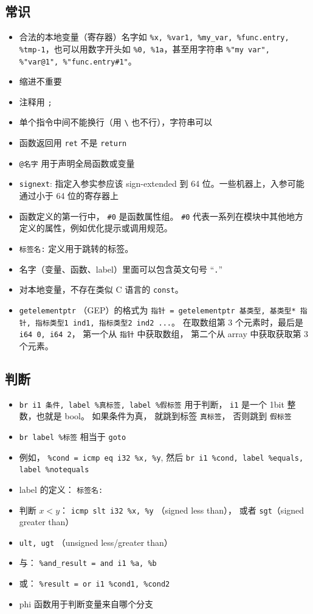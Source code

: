 \subsection{常识}
\begin{itemize}
\item 合法的本地变量（寄存器）名字如 \verb`%x, %var1, %my_var, %func.entry, %tmp-1`，也可以用数字开头如 \verb`%0, %1a`，甚至用字符串 \verb`%"my var", %"var@1", %"func.entry#1"`。
\item 缩进不重要
\item 注释用 \verb`;`
\item 单个指令中间不能换行（用 \verb`\` 也不行），字符串可以
\item 函数返回用 \verb`ret` 不是 \verb`return`
\item \verb`@名字` 用于声明全局函数或变量
\item \verb`signext`: 指定入参实参应该 sign-extended 到 64 位。一些机器上，入参可能通过小于 64 位的寄存器上
\item 函数定义的第一行中， \verb`#0` 是函数属性组。 \verb`#0` 代表一系列在模块中其他地方定义的属性，例如优化提示或调用规范。
\item \verb`标签名:` 定义用于跳转的标签。
\item 名字（变量、函数、label）里面可以包含英文句号 “\verb`.`”
\item 对本地变量，不存在类似 C 语言的 \verb`const`。
\item \verb`getelementptr` （GEP）的格式为 \verb`指针 = getelementptr 基类型, 基类型* 指针, 指标类型1 ind1, 指标类型2 ind2 ...`。 在取数组第 3 个元素时，最后是 \verb`i64 0, i64 2`， 第一个从 \verb`指针` 中获取数组， 第二个从 array 中获取获取第 3 个元素。
\end{itemize}

\subsection{判断}
\begin{itemize}
\item \verb`br i1 条件, label %真标签, label %假标签` 用于判断， \verb`i1` 是一个 1bit 整数，也就是 bool。 如果条件为真， 就跳到标签 \verb`真标签`， 否则跳到 \verb`假标签`
\item \verb`br label %标签` 相当于 \verb`goto`
\item 例如， \verb`%cond = icmp eq i32 %x, %y`, 然后 \verb`br i1 %cond, label %equals, label %notequals`
\item label 的定义： \verb`标签名:`
\item 判断 $x < y$： \verb`icmp slt i32 %x, %y` （signed less than）， 或者 \verb`sgt`（signed greater than）
\item \verb`ult, ugt` （unsigned less/greater than）
\item 与： \verb`%and_result = and i1 %a, %b`
\item 或： \verb`%result = or i1 %cond1, %cond2`
\item phi 函数用于判断变量来自哪个分支
\end{itemize}

